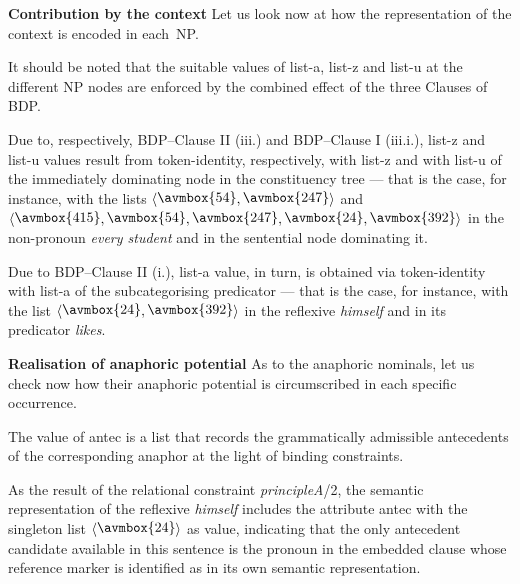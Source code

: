 \documentclass[output=paper
,modfonts
,nonflat]{langsci/langscibook}
\begin{document}
\textbf{Contribution by the context} Let us look now at how the representation of the context
is encoded in each~NP.

It should be noted that the suitable values of {\sc list-a}, {\sc list-z} 
and {\sc list-u} at the different NP nodes are enforced 
by the combined effect of the three Clauses of BDP. 

Due to, respectively, BDP--Clause II (iii.) and BDP--Clause I (iii.i.), {\sc list-z} and 
{\sc list-u} values result from token-identity, respectively, with {\sc list-z}
and with {\sc list-u} of the immediately dominating node in the 
constituency tree --- that is the case, for instance, with the lists 
$\langle\raisebox{.25ex}{\avmbox{54}},\raisebox{.25ex}{\avmbox{247}}\rangle$
and 
$\langle\raisebox{.25ex}{\avmbox{415}},\raisebox{.25ex}{\avmbox{54}},\raisebox{.25ex}{\avmbox{247}},\raisebox{.25ex}{\avmbox{24}},\raisebox{.25ex}{\avmbox{392}}\rangle$
in the non-pronoun \emph{every student} and in the sentential node dominating it. 

Due to BDP--Clause II (i.),
{\sc list-a} value, in turn, is obtained via token-identity with {\sc list-a} of
the subcategorising predicator --- that is the case, for instance, with the list 
$\langle\raisebox{.25ex}{\avmbox{24}},\raisebox{.25ex}{\avmbox{392}}\rangle$
in the reflexive \emph{himself} and in its predicator \emph{likes}. 



\textbf{Realisation of anaphoric potential} As to the anaphoric nominals, let us check now how their
anaphoric potential is circumscribed in each specific occurrence.

The value of {\sc antec} is a
list that records the grammatically admissible antecedents of the
corresponding anaphor at the light of binding constraints.

As the result of the relational constraint \emph{principleA}/2, the semantic
representation of the reflexive \emph{himself} includes the attribute
{\sc antec} with the singleton list 
$\langle\raisebox{.25ex}{\avmbox{24}}\rangle$
as value, indicating that the only antecedent candidate
available in this sentence is the pronoun in the embedded clause whose
reference marker is identified as
in its own
semantic representation. 
\end{document}
